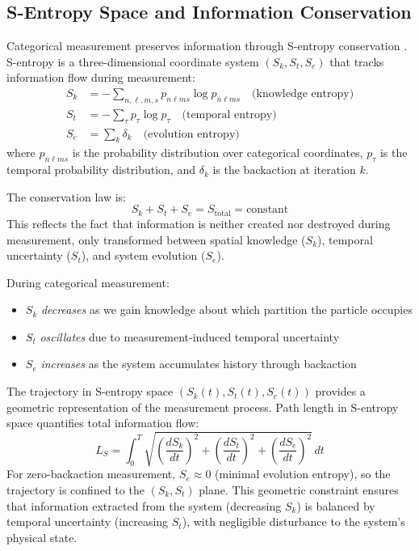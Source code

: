 \documentclass[twocolumn,10pt]{article}
\begin{document}
\subsection{S-Entropy Space and Information Conservation}

Categorical measurement preserves information through S-entropy conservation 
\cite{Sachikonye2026a}. S-entropy is a three-dimensional coordinate system 
$(S_k, S_t, S_e)$ that tracks information flow during measurement:
%
\begin{align}
S_k &= -\sum_{n,\ell,m,s} p_{n\ell ms} \log p_{n\ell ms} \quad \text{(knowledge entropy)} \label{eq:Sk} \\
S_t &= -\sum_{\tau} p_{\tau} \log p_{\tau} \quad \text{(temporal entropy)} \label{eq:St} \\
S_e &= \sum_{k} \delta_k \quad \text{(evolution entropy)} \label{eq:Se}
\end{align}
%
where $p_{n\ell ms}$ is the probability distribution over categorical coordinates, 
$p_{\tau}$ is the temporal probability distribution, and $\delta_k$ is the 
backaction at iteration $k$.

The conservation law is:
%
\begin{equation}
S_k + S_t + S_e = S_{\text{total}} = \text{constant}
\label{eq:entropy_conservation}
\end{equation}
%
This reflects the fact that information is neither created nor destroyed during 
measurement, only transformed between spatial knowledge ($S_k$), temporal 
uncertainty ($S_t$), and system evolution ($S_e$).

During categorical measurement:
%
\begin{itemize}
\item $S_k$ \textit{decreases} as we gain knowledge about which partition the 
particle occupies
\item $S_t$ \textit{oscillates} due to measurement-induced temporal uncertainty
\item $S_e$ \textit{increases} as the system accumulates history through backaction
\end{itemize}
%
The trajectory in S-entropy space $(S_k(t), S_t(t), S_e(t))$ provides a geometric 
representation of the measurement process. Path length in S-entropy space 
quantifies total information flow:
%
\begin{equation}
L_S = \int_0^T \sqrt{\left(\frac{dS_k}{dt}\right)^2 + \left(\frac{dS_t}{dt}\right)^2 + \left(\frac{dS_e}{dt}\right)^2} \, dt
\label{eq:path_length}
\end{equation}
%
For zero-backaction measurement, $S_e \approx 0$ (minimal evolution entropy), 
so the trajectory is confined to the $(S_k, S_t)$ plane. This geometric constraint 
ensures that information extracted from the system (decreasing $S_k$) is balanced 
by temporal uncertainty (increasing $S_t$), with negligible disturbance to the 
system's physical state.
\end{document}
